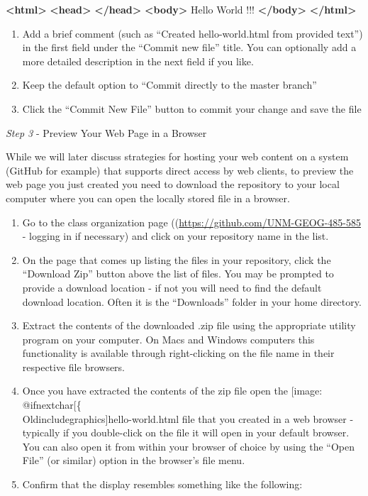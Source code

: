 \documentclass[]{book}
\makeatletter
\providecommand{\tightlist}{%
  \setlength{\itemsep}{0pt}\setlength{\parskip}{0pt}}
\newenvironment{Shaded}{}{}
\newcommand{\KeywordTok}[1]{\textcolor[rgb]{0.00,0.44,0.13}{\textbf{{#1}}}}
\newcommand{\NormalTok}[1]{{#1}}
\def\ScaleIfNeeded{%
  \ifdim\Gin@nat@width>.5\linewidth
    .5\linewidth
  \else
    \Gin@nat@width
  \fi
}
\let\Oldincludegraphics\texttt{[image: \%
 \\catcode`\\@=11\\relax\%
 \%\\gdef\\includegraphics\{\\@ifnextchar[\{\\Oldincludegraphics]}{\Oldincludegraphics[width=\ScaleIfNeeded]}}%
\gdef\texttt{[image: \\@ifnextchar[\{\\Oldincludegraphics]}{\Oldincludegraphics[max size={.75\textwidth}{.75\textheight}]}}%
\makeatother
\begin{document}
\begin{Shaded}
\begin{Highlighting}[numbers=left,,]
\KeywordTok{<html>}
    \KeywordTok{<head>}
    \KeywordTok{</head>}     
    \KeywordTok{<body>}
        \NormalTok{Hello World !!!}
    \KeywordTok{</body>} 
\KeywordTok{</html>}
\end{Highlighting}
\end{Shaded}

\begin{enumerate}
\def\labelenumi{\arabic{enumi}.}
\setcounter{enumi}{4}
\tightlist
\item
  Add a brief comment (such as ``Created hello-world.html from provided
  text'') in the first field under the ``Commit new file'' title. You
  can optionally add a more detailed description in the next field if
  you like.
\item
  Keep the default option to ``Commit directly to the master branch''
\item
  Click the ``Commit New File'' button to commit your change and save
  the file
\end{enumerate}

\emph{Step 3} - Preview Your Web Page in a Browser

While we will later discuss strategies for hosting your web content on a
system (GitHub for example) that supports direct access by web clients,
to preview the web page you just created you need to download the
repository to your local computer where you can open the locally stored
file in a browser.

\begin{enumerate}
\def\labelenumi{\arabic{enumi}.}
\tightlist
\item
  Go to the class organization page
  ((\url{https://github.com/UNM-GEOG-485-585} - logging in if necessary)
  and click on your repository name in the list.
\item
  On the page that comes up listing the files in your repository, click
  the ``Download Zip'' button above the list of files. You may be
  prompted to provide a download location - if not you will need to find
  the default download location. Often it is the ``Downloads'' folder in
  your home directory.
\item
  Extract the contents of the downloaded .zip file using the appropriate
  utility program on your computer. On Macs and Windows computers this
  functionality is available through right-clicking on the file name in
  their respective file browsers.
\item
  Once you have extracted the contents of the zip file open the
  \texttt{hello-world.html} file that you created in a web browser -
  typically if you double-click on the file it will open in your default
  browser. You can also open it from within your browser of choice by
  using the ``Open File'' (or similar) option in the browser's file
  menu.
\item
  Confirm that the display resembles something like the following:
\end{enumerate}
\end{document}

